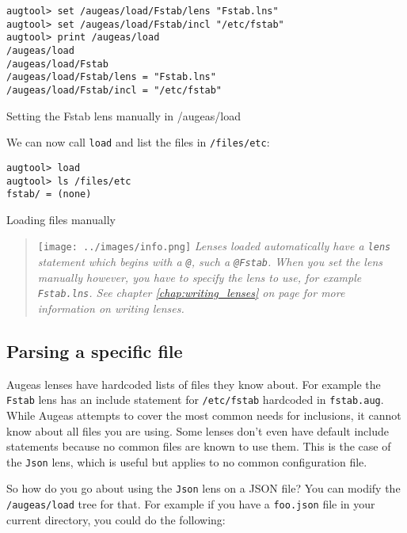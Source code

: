  

\begin{listing}
  \begin{verbatim}
augtool> set /augeas/load/Fstab/lens "Fstab.lns"
augtool> set /augeas/load/Fstab/incl "/etc/fstab"
augtool> print /augeas/load
/augeas/load
/augeas/load/Fstab
/augeas/load/Fstab/lens = "Fstab.lns"
/augeas/load/Fstab/incl = "/etc/fstab"
  \end{verbatim}
  \caption{Setting the Fstab lens manually in /augeas/load}
  \label{lst:metadata_setting_lens_manually}
\end{listing}

We can now call \verb!load! and list the files in \verb!/files/etc!:

 

\begin{listing}
  \begin{verbatim}
augtool> load
augtool> ls /files/etc
fstab/ = (none)
  \end{verbatim}
  \caption{Loading files manually}
  \label{lst:metadata_call_load}
\end{listing}

\begin{quote}
\texttt{[image: ../images/info.png]} \emph{Lenses loaded automatically have a \texttt{lens} statement which begins with a \texttt{@}, such a \texttt{@Fstab}. When you set the lens manually however, you have to specify the lens to use, for example \texttt{Fstab.lns}. See chapter \ref{chap:writing_lenses} on page \pageref{chap:writing_lenses} for more information on writing lenses.}

\end{quote}
\subsection{Parsing a specific file}

Augeas lenses have hardcoded lists of files they know about. For example the \verb!Fstab! lens has an include statement for \verb!/etc/fstab! hardcoded in \verb!fstab.aug!. While Augeas attempts to cover the most common needs for inclusions, it cannot know about all files you are using. Some lenses don't even have default include statements because no common files are known to use them. This is the case of the \verb!Json! lens, which is useful but applies to no common configuration file.

So how do you go about using the \verb!Json! lens on a JSON file? You can modify the \verb!/augeas/load! tree for that. For example if you have a \verb!foo.json! file in your current directory, you could do the following:

